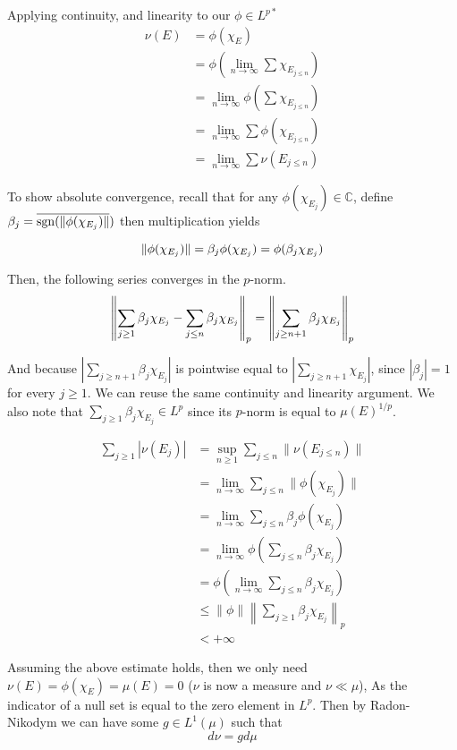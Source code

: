 \documentclass[../main.tex]{subfiles}
\begin{document}
Applying continuity, and linearity to our $\phi\in L^{p*}$
\begin{align*}
    \nu(E) &= \phi(\chi_E)\\[2ex]
    &= \phi\left(\lim_{n\to\infty} \sum \chi_{E_{j\leq n}}\right)\\[2ex]
    &= \lim_{n\to\infty} \phi\left(\sum \chi_{E_{j\leq n}}\right)\\[2ex]
    &= \lim_{n\to\infty} \sum \phi\left(\chi_{E_{j\leq n}}\right)\\[2ex]
    &= \lim_{n\to\infty} \sum \nu(E_{j\leq n})
\end{align*}

To show absolute convergence, recall that for any $\phi(\chi_{E_j})\in\mathbb{C}$, define $\beta_j = \overline{\operatorname{sgn}(\lVert {\phi(\chi_{E_j})} \rVert})$ then multiplication yields

$$
\lVert {\phi(\chi_{E_j})} \rVert = \beta_j\phi(\chi_{E_j}) = \phi(\beta_j\chi_{E_j})
$$

Then, the following series converges in the $p$-norm.
$$
\left\lVert {\sum_{j\geq 1} \beta_j\chi_{E_j} - \sum_{j\leq n} \beta_j\chi_{E_j}} \right\rVert_p  = \left\lVert {\sum_{j\geq n+1} \beta_j\chi_{E_j}} \right\rVert_p
$$

And because $\left|\sum_{j\geq n+1} \beta_j\chi_{E_j}\right|$ is pointwise equal to $\left|\sum_{j\geq n+1} \chi_{E_j}\right|$, since $|\beta_j|=1$ for every $j\geq 1$. We can reuse the same continuity and linearity argument. We also note that $\sum_{j\geq 1} \beta_j\chi_{E_j}\in L^p$  since its $p$-norm is equal to $\mu(E)^{1/p}$.

\begin{align*}
    \sum_{j\geq 1} \left|\nu(E_j)\right|&=\sup_{n\geq 1} \sum_{j\leq n} \lVert \nu(E_{j\leq n})\rVert\\[1ex]
    &= \lim_{n\to\infty} \sum_{j\leq n} \lVert \phi(\chi_{E_j})\rVert\\[1ex]
    &= \lim_{n\to\infty} \sum_{j\leq n} \beta_j\phi(\chi_{E_j})\\[1ex]
    &= \lim_{n\to\infty} \phi\left(\sum_{j\leq n}\beta_j\chi_{E_j}\right)\\[2ex]
    &= \phi\left(\lim_{n\to\infty} \sum_{j\leq n}\beta_j\chi_{E_j}\right)\\[2ex]
    &\leq \lVert \phi \rVert \left\lVert \sum_{j\geq 1} \beta_j\chi_{E_j}\right\rVert_p\\[1ex]
    &< +\infty
\end{align*}

Assuming the above estimate holds, then we only need $\nu(E) = \phi(\chi_E) = \mu(E) = 0$ ($\nu$ is now a measure and $\nu\ll\mu$), As the indicator of a null set is equal to the zero element in $L^p$. Then by Radon-Nikodym we can have some $g\in L^1(\mu)$ such that 
$$
d\nu = gd\mu
$$
\end{document}
